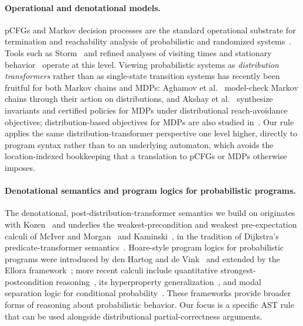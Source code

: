 \paragraph{Operational and denotational models.}
pCFGs and Markov decision processes are the standard operational substrate for termination and reachability analysis of probabilistic and randomized systems~\cite{DBLP:books/wi/Puterman94,DBLP:books/sp/BaierK08}. Tools such as Storm~\cite{DBLP:journals/sttt/HenselJKQV22} and refined analyses of visiting times and stationary behavior~\cite{DBLP:conf/tacas/MertensKQW24,DBLP:journals/jcss/JungesK0W21} operate at this level. Viewing probabilistic systems as \emph{distribution transformers} rather than as single-state transition systems has recently been fruitful for both Markov chains and MDPs: Aghamov et al.~\cite{DBLP:journals/corr/abs-2406-15087,DBLP:conf/birthday/AghamovBKNOPV25} model-check Markov chains through their action on distributions, and Akshay et al.~\cite{DBLP:conf/cav/AkshayCMZ23,DBLP:conf/ijcai/0001CMZ24} synthesize invariants and certified policies for MDPs under distributional reach-avoidance objectives; distribution-based objectives for MDPs are also studied in~\cite{DBLP:conf/lics/AkshayGV18}. Our rule applies the same distribution-transformer perspective one level higher, directly to program syntax rather than to an underlying automaton, which avoids the location-indexed bookkeeping that a translation to pCFGs or MDPs otherwise imposes.

\paragraph{Denotational semantics and program logics for probabilistic programs.}
The denotational, post-distribution-transformer semantics we build on originates with Kozen~\cite{DBLP:conf/focs/Kozen79,DBLP:conf/stoc/Kozen83} and underlies the weakest-precondition and weakest pre-expectation calculi of McIver and Morgan~\cite{DBLP:series/mcs/McIverM05} and Kaminski~\cite{DBLP:phd/dnb/Kaminski19}, in the tradition of Dijkstra's predicate-transformer semantics~\cite{DBLP:journals/cacm/Dijkstra75,DBLP:books/daglib/0067387}. Hoare-style program logics for probabilistic programs were introduced by den Hartog and de Vink~\cite{DBLP:journals/ijfcs/HartogV02} and extended by the Ellora framework~\cite{DBLP:conf/esop/BartheEGGHS18}; more recent calculi include quantitative strongest-postcondition reasoning~\cite{DBLP:journals/pacmpl/ZhangK22}, its hyperproperty generalization~\cite{DBLP:journals/corr/abs-2404-05097}, and modal separation logic for conditional probability~\cite{DBLP:journals/pacmpl/Li0H23}. These frameworks provide broader forms of reasoning about probabilistic behavior. Our focus is a specific AST rule that can be used alongside distributional partial-correctness arguments.


